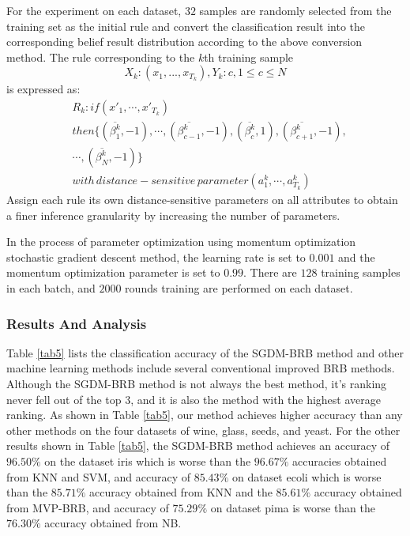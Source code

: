 \documentclass{ieeeaccess}
\begin{document}
For the experiment on each dataset, $32$ samples are randomly selected from the training set as the initial rule
and convert the classification result into the corresponding belief result distribution according to the above conversion method.
The rule corresponding to the $k$th training sample
\begin{equation}
    X_k:(x_1,...,x_{T_k}),Y_k:c,1\leq c\leq N
\end{equation}
is expressed as:
\begin{equation}
    \begin{split}
        &R_k:if(x'_1,\cdots,x'_{T_k})\\
        &then\{(\overline{\beta_1^k},-1),\cdots,(\overline{\beta_{c-1}^k},-1),(\overline{\beta_c^k},1),(\overline{\beta_{c+1}^k},-1),\\
        &\cdots,(\overline{\beta_N^k},-1)\}\\
        &with\, distance-sensitive\, parameter(a^k_1,\cdots,a^k_{T_k})
    \end{split}
\end{equation}
Assign each rule its own distance-sensitive parameters on all attributes to obtain a finer inference granularity by increasing the number of parameters.

In the process of parameter optimization using momentum optimization stochastic gradient descent method,
the learning rate is set to $0.001$ and the momentum optimization parameter is set to $0.99$.
There are $128$ training samples in each batch, and $2000$ rounds training are performed on each dataset.

\subsubsection{Results And Analysis}
Table \ref{tab5} lists the classification accuracy of the SGDM-BRB method and other machine learning methods include several conventional improved BRB methods.
Although the SGDM-BRB method is not always the best method, it's ranking never fell out of the top $3$, and it is also the method with the highest average ranking.
As shown in Table \ref{tab5}, our method achieves higher accuracy than any other methods on the four datasets of
wine, glass, seeds, and yeast.
For the other results shown in Table \ref{tab5},
the SGDM-BRB method achieves an accuracy of $96.50\%$ on the dataset iris
which is worse than the $96.67\%$ accuracies obtained from KNN and SVM,
and accuracy of $85.43\%$ on dataset ecoli
which is worse than the $85.71\%$ accuracy obtained from KNN and the $85.61\%$ accuracy obtained from MVP-BRB,
and accuracy of $75.29\%$ on dataset pima is worse than the $76.30\%$ accuracy obtained from NB.
\end{document}
